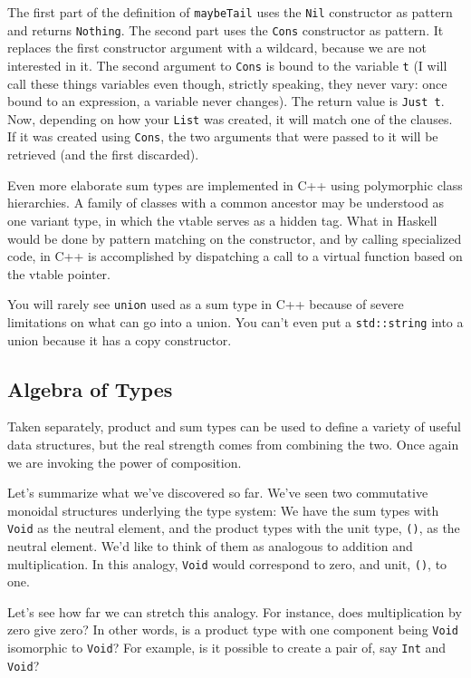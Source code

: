 \noindent
The first part of the definition of \texttt{maybeTail} uses the
\texttt{Nil} constructor as pattern and returns \texttt{Nothing}. The
second part uses the \texttt{Cons} constructor as pattern. It replaces
the first constructor argument with a wildcard, because we are not
interested in it. The second argument to \texttt{Cons} is bound to the
variable \texttt{t} (I will call these things variables even though,
strictly speaking, they never vary: once bound to an expression, a
variable never changes). The return value is \texttt{Just\ t}. Now,
depending on how your \texttt{List} was created, it will match one of
the clauses. If it was created using \texttt{Cons}, the two arguments
that were passed to it will be retrieved (and the first discarded).

Even more elaborate sum types are implemented in C++ using polymorphic
class hierarchies. A family of classes with a common ancestor may be
understood as one variant type, in which the vtable serves as a hidden
tag. What in Haskell would be done by pattern matching on the
constructor, and by calling specialized code, in C++ is accomplished by
dispatching a call to a virtual function based on the vtable pointer.

You will rarely see \texttt{union} used as a sum type in C++ because of
severe limitations on what can go into a union. You can't even put a
\texttt{std::string} into a union because it has a copy constructor.

\subsection{Algebra of Types}\label{algebra-of-types}

Taken separately, product and sum types can be used to define a variety
of useful data structures, but the real strength comes from combining
the two. Once again we are invoking the power of composition.

Let's summarize what we've discovered so far. We've seen two commutative
monoidal structures underlying the type system: We have the sum types
with \texttt{Void} as the neutral element, and the product types with
the unit type, \texttt{()}, as the neutral element. We'd like to think
of them as analogous to addition and multiplication. In this analogy,
\texttt{Void} would correspond to zero, and unit, \texttt{()}, to one.

Let's see how far we can stretch this analogy. For instance, does
multiplication by zero give zero? In other words, is a product type with
one component being \texttt{Void} isomorphic to \texttt{Void}? For
example, is it possible to create a pair of, say \texttt{Int} and
\texttt{Void}?

